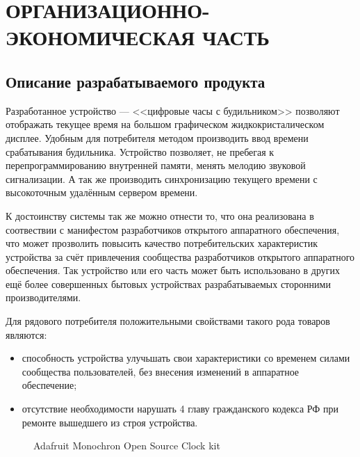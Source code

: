 \section{ОРГАНИЗАЦИОННО-ЭКОНОМИЧЕСКАЯ ЧАСТЬ}

\subsection{Описание разрабатываемого продукта}
\begin{par}
Разработанное устройство --- <<цифровые часы с будильником>> позволяют отображать
текущее время на большом графическом жидкокристалическом дисплее. Удобным для
потребителя методом производить ввод времени срабатывания будильника.
Устройство позволяет, не пребегая к перепрограммированию внутренней памяти, менять
мелодию звуковой сигнализации. А так же производить синхронизацию текущего времени
с высокоточным удалённым сервером времени.
\end{par}

\begin{par}
К достоинству системы так же можно отнести то, что она реализована в соотвествии с манифестом
разработчиков открытого аппаратного обеспечения, что может прозволить повысить качество потребительских
характеристик устройства за счёт привлечения сообщества разработчиков открытого аппаратного
обеспечения. Так устройство или его часть может быть использовано в других ещё более
совершенных бытовых устройствах разрабатываемых сторонними производителями.

Для рядового потребителя положительными свойствами такого рода товаров являются:
\begin{itemize}
    \item{} способность устройства улучьшать свои характеристики со временем силами сообщества пользователей,
        без внесения изменений в аппаратное обеспечение;
    \item{} отсутствие необходимости нарушать 4 главу гражданского кодекса РФ при
        ремонте вышедшего из строя устройства.
\end{itemize}

\begin{figure}[h]
	\caption{Adafruit Monochron Open Source Clock kit}
	\label{img:adafruit}
\end{figure}

\end{par}

